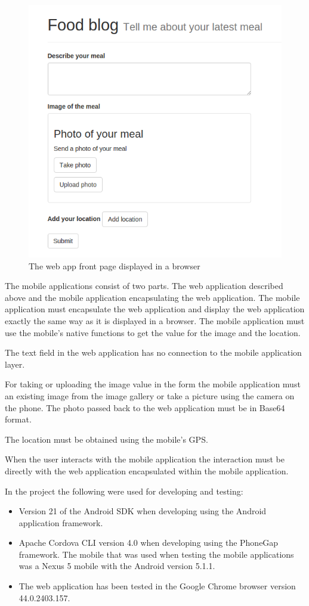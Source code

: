 \begin{figure}[h!]
	\centering
    \includegraphics[width=120mm,natwidth=800,natheight=600]{./img/webAppFrontPage.png}
    \caption{The web app front page displayed in a browser}
    \label{fig:nativeuml}
\end{figure}

The mobile applications consist of two parts. The web application described above and the mobile application encapsulating the web application. The mobile application must encapsulate the web application and display the web application exactly the same way as it is displayed in a browser. The mobile application must use the mobile’s native functions to get the value for the image and the location.

The text field in the web application has no connection to the mobile application layer. 

For taking or uploading the image value in the form the mobile application must an existing image from the image gallery or take a picture using the camera on the phone. The photo passed back to the web application must be in Base64 format. 

The location must be obtained using the mobile’s GPS. 

When the user interacts with the mobile application the interaction must be directly with the web application encapsulated within the mobile application. 

In the project the following were used for developing and testing:
\begin{itemize}
\item Version 21 of the Android SDK when developing using the Android application framework.
\item Apache Cordova CLI version 4.0 when developing using the PhoneGap framework. 
The mobile that was used when testing the mobile applications was a Nexus 5 mobile with the Android version 5.1.1.
\item The web application has been tested in the Google Chrome browser version 44.0.2403.157.
\end{itemize}

